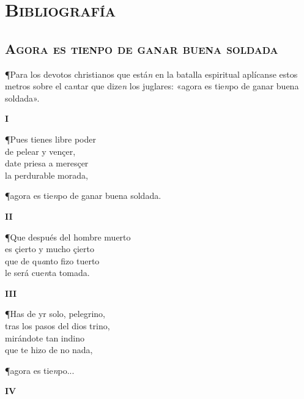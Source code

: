 \documentclass[11pt,twoside]{article}
\newcommand{\centre}[1]{{\centering \textbf{#1}\par}}
\begin{document}
\section*{\centering\textsc{Bibliografía}}
  \nocite{*}
  \printbibliography[heading=none]
\newpage
%
\subsection*{\centering\textsc{Agora es tienpo de ganar buena soldada}}
%
\noindent[f. 25v] ¶Para los devotos christianos que está\emph{n} en la batalla espiritual aplícanse estos metros sobre el ca\emph{n}tar que dize\emph{n} los juglares: «agora es tie\emph{n}po de ganar buena soldada».\par%
%
\bnum
\centre{I}
\postart
¶Pues tienes libre poder\\
de pelear y vençer,\\
date priesa a meresçer\\
la perdurable morada,\par
¶agora es tie\emph{n}po de ganar buena soldada.\par
\poend
%
\begin{center}
\textbf{II}
\end{center}
\postart
¶Que después del hombre muerto\\
es çierto y mucho çierto\\
que de q\emph{ua}nto fizo tuerto\\
le será cue\emph{n}ta tomada.\par
\poend
%
\begin{center}
\textbf{III}
\end{center}
\postart
¶Has de yr solo, pelegrino,\\
tras los pasos del dios trino,\\
mirándote tan indino\\
que te hizo de no nada,\par
¶agora es tie\emph{n}po...\par
\poend
%
\begin{center}
\textbf{IV}
\end{center}
\end{document}
